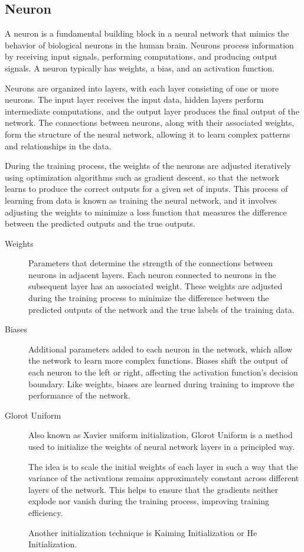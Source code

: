 \documentclass[a4paper]{article}
\begin{document}
\subsection*{Neuron}
A neuron is a fundamental building block in a neural network that mimics the behavior of biological neurons in the human brain. Neurons process information by receiving input signals, performing computations, and producing output signals. A neuron typically has weights, a bias, and an activation function.

Neurons are organized into layers, with each layer consisting of one or more neurons. The input layer receives the input data, hidden layers perform intermediate computations, and the output layer produces the final output of the network. The connections between neurons, along with their associated weights, form the structure of the neural network, allowing it to learn complex patterns and relationships in the data.

During the training process, the weights of the neurons are adjusted iteratively using optimization algorithms such as gradient descent, so that the network learns to produce the correct outputs for a given set of inputs. This process of learning from data is known as training the neural network, and it involves adjusting the weights to minimize a loss function that measures the difference between the predicted outputs and the true outputs.

\begin{description}
\item[Weights]
Parameters that determine the strength of the connections between neurons in adjacent layers. Each neuron connected to neurons in the subsequent layer has an associated weight. These weights are adjusted during the training process to minimize the difference between the predicted outputs of the network and the true labels of the training data.

\item[Biases]
Additional parameters added to each neuron in the network, which allow the network to learn more complex functions. Biases shift the output of each neuron to the left or right, affecting the activation function's decision boundary. Like weights, biases are learned during training to improve the performance of the network.

\item[Glorot Uniform]
Also known as Xavier uniform initialization, Glorot Uniform is a method used to initialize the weights of neural network layers in a principled way. 

The idea is to scale the initial weights of each layer in such a way that the variance of the activations remains approximately constant across different layers of the network. This helps to ensure that the gradients neither explode nor vanish during the training process, improving training efficiency.

Another initialization technique is Kaiming Initialization or He Initialization.
\end{description}
\end{document}
